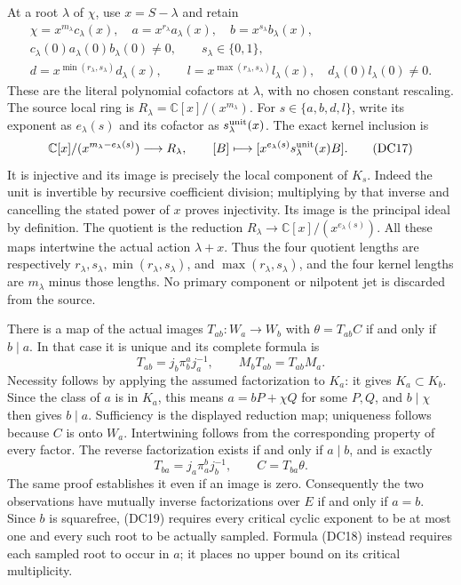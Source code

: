 \documentclass{article}
\begin{document}
At a root $\lambda$ of $\chi$, use $x=S-\lambda$ and retain
\[
 \begin{gathered}
 \chi=x^{m_\lambda}c_\lambda(x),\quad
 a=x^{r_\lambda}a_\lambda(x),\quad
 b=x^{s_\lambda}b_\lambda(x),\\
 c_\lambda(0)a_\lambda(0)b_\lambda(0)\ne0,\qquad
 s_\lambda\in\{0,1\},\\
 d=x^{\min(r_\lambda,s_\lambda)}d_\lambda(x),\qquad
 l=x^{\max(r_\lambda,s_\lambda)}l_\lambda(x),
 \quad d_\lambda(0)l_\lambda(0)\ne0 .
 \end{gathered}
 \tag{DC16}
\]
These are the literal polynomial cofactors at $\lambda$, with no
chosen constant rescaling.  The source local ring is
$R_\lambda=\mathbb C[x]/(x^{m_\lambda})$.  For
$s\in\{a,b,d,l\}$, write its exponent as $e_\lambda(s)$ and its
cofactor as $s_\lambda^{\rm unit}(x)$.  The exact kernel inclusion is
\[
 \mathbb C[x]/(x^{m_\lambda-e_\lambda(s)})
 \longrightarrow R_\lambda,\qquad
 [B]\longmapsto
 [x^{e_\lambda(s)}s_\lambda^{\rm unit}(x)B].
 \tag{DC17}
\]
It is injective and its image is precisely the local component of
$K_s$.  Indeed the unit is invertible by recursive coefficient
division; multiplying by that inverse and cancelling the stated
power of $x$ proves injectivity.  Its image is the principal ideal
by definition.  The quotient is the reduction
$R_\lambda\to\mathbb C[x]/(x^{e_\lambda(s)})$.
All these maps intertwine the actual action $\lambda+x$.
Thus the four quotient lengths are respectively
$r_\lambda,s_\lambda,\min(r_\lambda,s_\lambda)$, and
$\max(r_\lambda,s_\lambda)$, and the four kernel lengths are
$m_\lambda$ minus those lengths.  No primary component or nilpotent
jet is discarded from the source.

There is a map of the actual images $T_{ab}:W_a\to W_b$ with
$\theta=T_{ab}C$ if and only if $b\mid a$.  In that case it is
unique and its complete formula is
\[
 T_{ab}=j_b\pi_b^a j_a^{-1},\qquad
 M_bT_{ab}=T_{ab}M_a .
 \tag{DC18}
\]
Necessity follows by applying the assumed factorization to
$K_a$: it gives $K_a\subset K_b$.  Since the class of $a$ is in
$K_a$, this means $a=bP+\chi Q$ for some $P,Q$, and $b\mid\chi$
then gives $b\mid a$.  Sufficiency is the displayed reduction map;
uniqueness follows because $C$ is onto $W_a$.  Intertwining follows
from the corresponding property of every factor.  The reverse
factorization exists if and only if $a\mid b$, and is exactly
\[
 T_{ba}=j_a\pi_a^b j_b^{-1},\qquad C=T_{ba}\theta .
 \tag{DC19}
\]
The same proof establishes it even if an image is zero.
Consequently the two observations have mutually inverse
factorizations over $E$ if and only if $a=b$.  Since $b$ is
squarefree, (DC19) requires every critical cyclic exponent to be at
most one and every such root to be actually sampled.  Formula
(DC18) instead requires each sampled root to occur in $a$; it
places no upper bound on its critical multiplicity.
\end{document}
